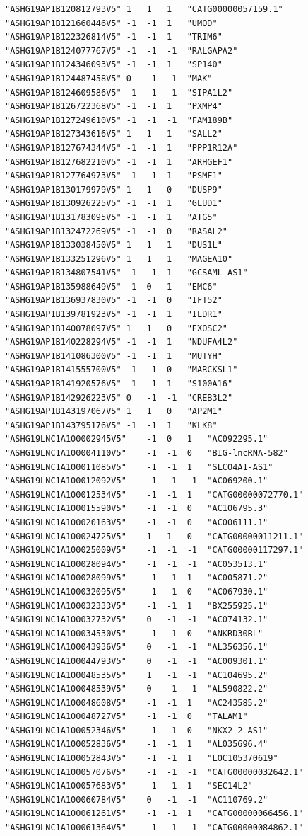 \documentclass[en,black,12pt,normal]{elegantnote}
\begin{document}
\begin{lstlisting}
"ASHG19AP1B120812793V5"	1	1	1	"CATG00000057159.1"
"ASHG19AP1B121660446V5"	-1	-1	1	"UMOD"
"ASHG19AP1B122326814V5"	-1	-1	1	"TRIM6"
"ASHG19AP1B124077767V5"	-1	-1	-1	"RALGAPA2"
"ASHG19AP1B124346093V5"	-1	-1	1	"SP140"
"ASHG19AP1B124487458V5"	0	-1	-1	"MAK"
"ASHG19AP1B124609586V5"	-1	-1	-1	"SIPA1L2"
"ASHG19AP1B126722368V5"	-1	-1	1	"PXMP4"
"ASHG19AP1B127249610V5"	-1	-1	-1	"FAM189B"
"ASHG19AP1B127343616V5"	1	1	1	"SALL2"
"ASHG19AP1B127674344V5"	-1	-1	1	"PPP1R12A"
"ASHG19AP1B127682210V5"	-1	-1	1	"ARHGEF1"
"ASHG19AP1B127764973V5"	-1	-1	1	"PSMF1"
"ASHG19AP1B130179979V5"	1	1	0	"DUSP9"
"ASHG19AP1B130926225V5"	-1	-1	1	"GLUD1"
"ASHG19AP1B131783095V5"	-1	-1	1	"ATG5"
"ASHG19AP1B132472269V5"	-1	-1	0	"RASAL2"
"ASHG19AP1B133038450V5"	1	1	1	"DUS1L"
"ASHG19AP1B133251296V5"	1	1	1	"MAGEA10"
"ASHG19AP1B134807541V5"	-1	-1	1	"GCSAML-AS1"
"ASHG19AP1B135988649V5"	-1	0	1	"EMC6"
"ASHG19AP1B136937830V5"	-1	-1	0	"IFT52"
"ASHG19AP1B139781923V5"	-1	-1	1	"ILDR1"
"ASHG19AP1B140078097V5"	1	1	0	"EXOSC2"
"ASHG19AP1B140228294V5"	-1	-1	1	"NDUFA4L2"
"ASHG19AP1B141086300V5"	-1	-1	1	"MUTYH"
"ASHG19AP1B141555700V5"	-1	-1	0	"MARCKSL1"
"ASHG19AP1B141920576V5"	-1	-1	1	"S100A16"
"ASHG19AP1B142926223V5"	0	-1	-1	"CREB3L2"
"ASHG19AP1B143197067V5"	1	1	0	"AP2M1"
"ASHG19AP1B143795176V5"	-1	-1	1	"KLK8"
"ASHG19LNC1A100002945V5"	-1	0	1	"AC092295.1"
"ASHG19LNC1A100004110V5"	-1	-1	0	"BIG-lncRNA-582"
"ASHG19LNC1A100011085V5"	-1	-1	1	"SLCO4A1-AS1"
"ASHG19LNC1A100012092V5"	-1	-1	-1	"AC069200.1"
"ASHG19LNC1A100012534V5"	-1	-1	1	"CATG00000072770.1"
"ASHG19LNC1A100015590V5"	-1	-1	0	"AC106795.3"
"ASHG19LNC1A100020163V5"	-1	-1	0	"AC006111.1"
"ASHG19LNC1A100024725V5"	1	1	0	"CATG00000011211.1"
"ASHG19LNC1A100025009V5"	-1	-1	-1	"CATG00000117297.1"
"ASHG19LNC1A100028094V5"	-1	-1	-1	"AC053513.1"
"ASHG19LNC1A100028099V5"	-1	-1	1	"AC005871.2"
"ASHG19LNC1A100032095V5"	-1	-1	0	"AC067930.1"
"ASHG19LNC1A100032333V5"	-1	-1	1	"BX255925.1"
"ASHG19LNC1A100032732V5"	0	-1	-1	"AC074132.1"
"ASHG19LNC1A100034530V5"	-1	-1	0	"ANKRD30BL"
"ASHG19LNC1A100043936V5"	0	-1	-1	"AL356356.1"
"ASHG19LNC1A100044793V5"	0	-1	-1	"AC009301.1"
"ASHG19LNC1A100048535V5"	1	-1	-1	"AC104695.2"
"ASHG19LNC1A100048539V5"	0	-1	-1	"AL590822.2"
"ASHG19LNC1A100048608V5"	-1	-1	1	"AC243585.2"
"ASHG19LNC1A100048727V5"	-1	-1	0	"TALAM1"
"ASHG19LNC1A100052346V5"	-1	-1	0	"NKX2-2-AS1"
"ASHG19LNC1A100052836V5"	-1	-1	1	"AL035696.4"
"ASHG19LNC1A100052843V5"	-1	-1	1	"LOC105370619"
"ASHG19LNC1A100057076V5"	-1	-1	-1	"CATG00000032642.1"
"ASHG19LNC1A100057683V5"	-1	-1	1	"SEC14L2"
"ASHG19LNC1A100060784V5"	0	-1	-1	"AC110769.2"
"ASHG19LNC1A100061261V5"	-1	-1	1	"CATG00000066456.1"
"ASHG19LNC1A100061364V5"	-1	-1	-1	"CATG00000084862.1"

\end{lstlisting}
\end{document}
